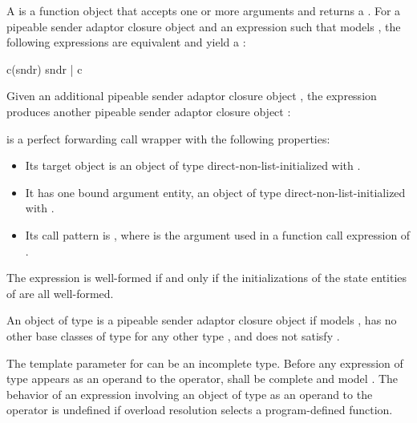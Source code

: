 %
\pnum
A  is a function object
that accepts one or more  arguments and returns a .
For a pipeable sender adaptor closure object  and
an expression 
such that  models ,
the following expressions are equivalent and yield a :
\begin{codeblock}
c(sndr)
sndr | c
\end{codeblock}
Given an additional pipeable sender adaptor closure object ,
the expression  produces
another pipeable sender adaptor closure object :

 is a perfect forwarding call wrapper
with the following properties:
\begin{itemize}
\item
Its target object is an object  of type 
direct-non-list-initialized with .
\item
It has one bound argument entity,
an object  of type 
direct-non-list-initialized with .
\item
Its call pattern is ,
where  is the argument used in a function call expression of .
\end{itemize}
The expression  is well-formed if and only if
the initializations of the state entities of 
are all well-formed.

\pnum
An object  of type  is
a pipeable sender adaptor closure object
if  models ,
 has no other base classes
of type  for any other type , and
 does not satisfy .

\pnum
The template parameter  for  can be
an incomplete type.
Before any expression of type \cv{}  appears as
an operand to the \tcode{|} operator,
 shall be complete and
model .
The behavior of an expression involving an object of type \cv{} 
as an operand to the \tcode{|} operator is undefined
if overload resolution selects a program-defined  function.

